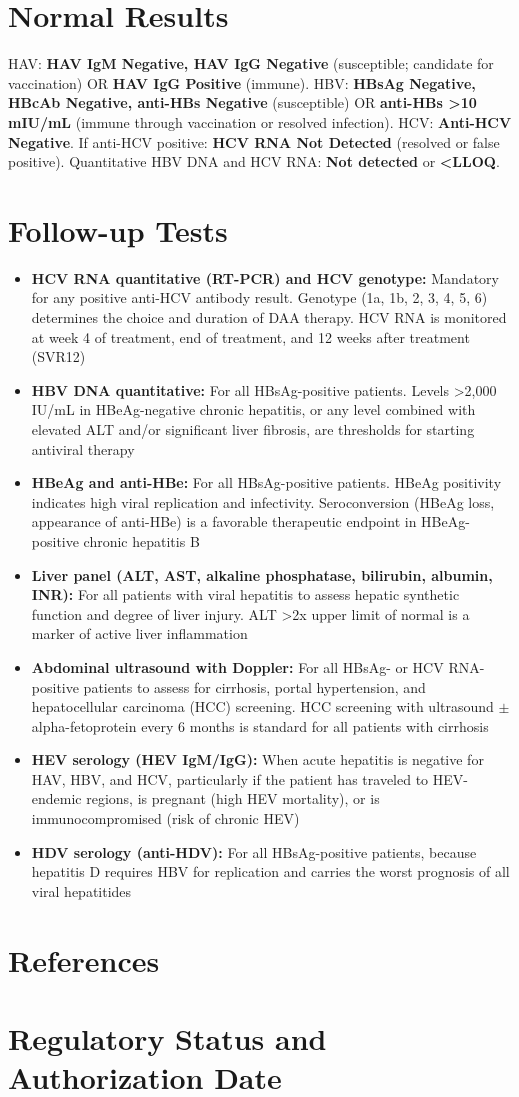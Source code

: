 \section*{Normal Results}
HAV: \textbf{HAV IgM Negative, HAV IgG Negative} (susceptible; candidate for vaccination) OR \textbf{HAV IgG Positive} (immune). HBV: \textbf{HBsAg Negative, HBcAb Negative, anti-HBs Negative} (susceptible) OR \textbf{anti-HBs >10 mIU/mL} (immune through vaccination or resolved infection). HCV: \textbf{Anti-HCV Negative}. If anti-HCV positive: \textbf{HCV RNA Not Detected} (resolved or false positive). Quantitative HBV DNA and HCV RNA: \textbf{Not detected} or \textbf{<LLOQ}.

\section*{Follow-up Tests}
\begin{itemize}
  \item \textbf{HCV RNA quantitative (RT-PCR) and HCV genotype:} Mandatory for any positive anti-HCV antibody result. Genotype (1a, 1b, 2, 3, 4, 5, 6) determines the choice and duration of DAA therapy. HCV RNA is monitored at week 4 of treatment, end of treatment, and 12 weeks after treatment (SVR12)
  \item \textbf{HBV DNA quantitative:} For all HBsAg-positive patients. Levels >2,000 IU/mL in HBeAg-negative chronic hepatitis, or any level combined with elevated ALT and/or significant liver fibrosis, are thresholds for starting antiviral therapy
  \item \textbf{HBeAg and anti-HBe:} For all HBsAg-positive patients. HBeAg positivity indicates high viral replication and infectivity. Seroconversion (HBeAg loss, appearance of anti-HBe) is a favorable therapeutic endpoint in HBeAg-positive chronic hepatitis B
  \item \textbf{Liver panel (ALT, AST, alkaline phosphatase, bilirubin, albumin, INR):} For all patients with viral hepatitis to assess hepatic synthetic function and degree of liver injury. ALT >2x upper limit of normal is a marker of active liver inflammation
  \item \textbf{Abdominal ultrasound with Doppler:} For all HBsAg- or HCV RNA-positive patients to assess for cirrhosis, portal hypertension, and hepatocellular carcinoma (HCC) screening. HCC screening with ultrasound $\pm$ alpha-fetoprotein every 6 months is standard for all patients with cirrhosis
  \item \textbf{HEV serology (HEV IgM/IgG):} When acute hepatitis is negative for HAV, HBV, and HCV, particularly if the patient has traveled to HEV-endemic regions, is pregnant (high HEV mortality), or is immunocompromised (risk of chronic HEV)
  \item \textbf{HDV serology (anti-HDV):} For all HBsAg-positive patients, because hepatitis D requires HBV for replication and carries the worst prognosis of all viral hepatitides
\end{itemize}

\section*{References}



\clearpage
\section*{Regulatory Status and Authorization Date}

\clearpage
